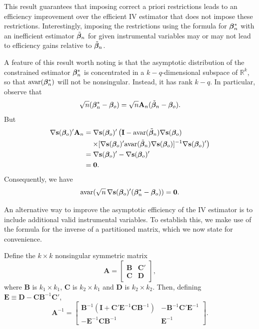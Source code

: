 This result guarantees that imposing correct a priori restrictions leads
to an efficiency improvement over the efficient IV estimator that does not
impose these restrictions. Interestingly, imposing the restrictions using the
formula for $\boldsymbol{\beta}_n^*$ with an inefficient estimator $\tilde{\boldsymbol{\beta}}_n$ for given instrumental variables may or may not lead to efficiency gains relative to $\tilde{\boldsymbol{\beta}}_n$.

A feature of this result worth noting is that the asymptotic distribution
of the constrained estimator $\boldsymbol{\beta}_n^*$ is concentrated in a $k - q$-dimensional
subspace of $\mathbb{R}^k$, so that $\mathrm{avar}(\boldsymbol{\beta}_n^*)$ will not be nonsingular. Instead, it has
rank $k - q$. In particular, observe that
\[
\sqrt{n}(\boldsymbol{\beta}_n^* - \boldsymbol{\beta}_o) = \sqrt{n}\mathbf{A}_n(\tilde{\boldsymbol{\beta}}_n - \boldsymbol{\beta}_o).
\]
But
\begin{align*}
\nabla \mathbf{s}(\boldsymbol{\beta}_o)'\mathbf{A}_n &= \nabla \mathbf{s}(\boldsymbol{\beta}_o)'\left(\mathbf{I} - \mathrm{avar}(\tilde{\boldsymbol{\beta}}_n)\nabla \mathbf{s}(\boldsymbol{\beta}_o)\right. \\
&\quad\left.\times[\nabla \mathbf{s}(\boldsymbol{\beta}_o)'\mathrm{avar}(\tilde{\boldsymbol{\beta}}_n)\nabla \mathbf{s}(\boldsymbol{\beta}_o)]^{-1}\nabla \mathbf{s}(\boldsymbol{\beta}_o)'\right) \\
&= \nabla \mathbf{s}(\boldsymbol{\beta}_o)' - \nabla \mathbf{s}(\boldsymbol{\beta}_o)' \\
&= \mathbf{0}.
\end{align*}
Consequently, we have
\[
\mathrm{avar}(\sqrt{n}\,\nabla \mathbf{s}(\boldsymbol{\beta}_o)'(\boldsymbol{\beta}_n^* - \boldsymbol{\beta}_o)) = \mathbf{0}.
\]

An alternative way to improve the asymptotic efficiency of the IV estimator is to include additional valid instrumental variables. To establish
this, we make use of the formula for the inverse of a partitioned matrix,
which we now state for convenience.

\begin{proposition}\label{prop:4.50}
Define the $k \times k$ nonsingular symmetric matrix
\[
\mathbf{A} = \begin{bmatrix} \mathbf{B} & \mathbf{C}' \\ \mathbf{C} & \mathbf{D} \end{bmatrix},
\]
where $\mathbf{B}$ is $k_1 \times k_1$, $\mathbf{C}$ is $k_2 \times k_1$ and $\mathbf{D}$ is $k_2 \times k_2$. Then, defining $\mathbf{E} \equiv \mathbf{D} - \mathbf{C}\mathbf{B}^{-1}\mathbf{C}'$,
\[
\mathbf{A}^{-1} = \begin{bmatrix} \mathbf{B}^{-1}(\mathbf{I} + \mathbf{C}'\mathbf{E}^{-1}\mathbf{C}\mathbf{B}^{-1}) & -\mathbf{B}^{-1}\mathbf{C}'\mathbf{E}^{-1} \\ -\mathbf{E}^{-1}\mathbf{C}\mathbf{B}^{-1} & \mathbf{E}^{-1} \end{bmatrix}.
\]
\end{proposition}

